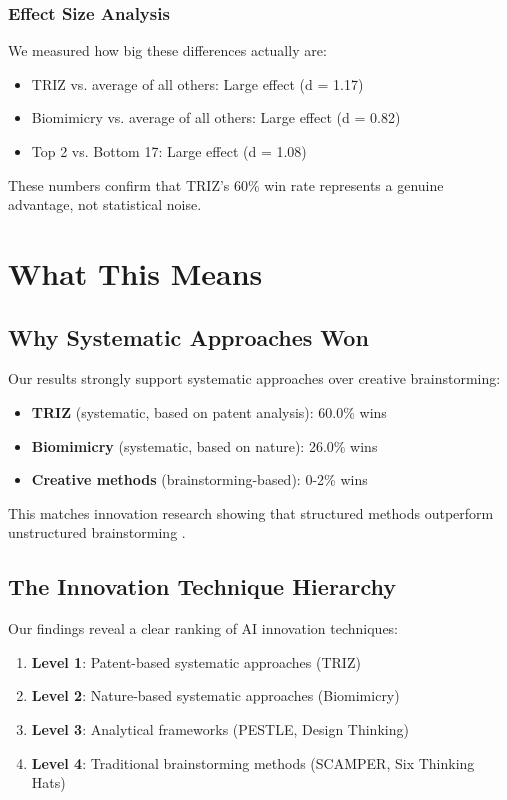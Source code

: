 \documentclass[12pt]{article}
\begin{document}
\subsubsection{Effect Size Analysis}
We measured how big these differences actually are:
\begin{itemize}
\item TRIZ vs. average of all others: Large effect (d = 1.17)
\item Biomimicry vs. average of all others: Large effect (d = 0.82)
\item Top 2 vs. Bottom 17: Large effect (d = 1.08)
\end{itemize}

These numbers confirm that TRIZ's 60\% win rate represents a genuine advantage, not statistical noise.

\section{What This Means}

\subsection{Why Systematic Approaches Won}

Our results strongly support systematic approaches over creative brainstorming:

\begin{itemize}
\item \textbf{TRIZ} (systematic, based on patent analysis): 60.0\% wins
\item \textbf{Biomimicry} (systematic, based on nature): 26.0\% wins
\item \textbf{Creative methods} (brainstorming-based): 0-2\% wins
\end{itemize}

This matches innovation research showing that structured methods outperform unstructured brainstorming \cite{altshuller1999innovation}.

\subsection{The Innovation Technique Hierarchy}

Our findings reveal a clear ranking of AI innovation techniques:

\begin{enumerate}
\item \textbf{Level 1}: Patent-based systematic approaches (TRIZ)
\item \textbf{Level 2}: Nature-based systematic approaches (Biomimicry)  
\item \textbf{Level 3}: Analytical frameworks (PESTLE, Design Thinking)
\item \textbf{Level 4}: Traditional brainstorming methods (SCAMPER, Six Thinking Hats)
\end{enumerate}
\end{document}
